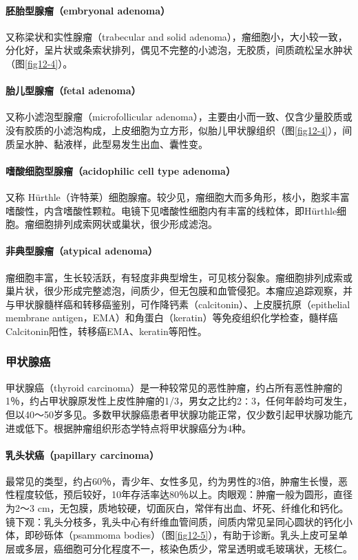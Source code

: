 \paragraph{胚胎型腺瘤（embryonal adenoma）}
又称梁状和实性腺瘤（trabecular
and solid
adenoma），瘤细胞小，大小较一致，分化好，呈片状或条索状排列，偶见不完整的小滤泡，无胶质，间质疏松呈水肿状（图\ref{fig12-4}）。

\paragraph{胎儿型腺瘤（fetal adenoma）}
又称小滤泡型腺瘤（microfollicular
adenoma），主要由小而一致、仅含少量胶质或没有胶质的小滤泡构成，上皮细胞为立方形，似胎儿甲状腺组织（图\ref{fig12-4}），间质呈水肿、黏液样，此型易发生出血、囊性变。

\paragraph{嗜酸细胞型腺瘤（acidophilic cell type adenoma）}
又称
Hürthle（许特莱）细胞腺瘤。较少见，瘤细胞大而多角形，核小，胞浆丰富嗜酸性，内含嗜酸性颗粒。电镜下见嗜酸性细胞内有丰富的线粒体，即Hürthle细胞。瘤细胞排列成索网状或巢状，很少形成滤泡。

\paragraph{非典型腺瘤（atypical adenoma）}
瘤细胞丰富，生长较活跃，有轻度非典型增生，可见核分裂象。瘤细胞排列成索或巢片状，很少形成完整滤泡，间质少，但无包膜和血管侵犯。本瘤应追踪观察，并与甲状腺髓样癌和转移癌鉴别，可作降钙素（calcitonin）、上皮膜抗原（epithelial
membrane
antigen，EMA）和角蛋白（keratin）等免疫组织化学检查，髓样癌Calcitonin阳性，转移癌EMA、keratin等阳性。

\subsubsection{甲状腺癌}

甲状腺癌（thyroid
carcinoma）是一种较常见的恶性肿瘤，约占所有恶性肿瘤的1％，约占甲状腺原发性上皮性肿瘤的1/3，男女之比约2∶3，任何年龄均可发生，但以40～50岁多见。多数甲状腺癌患者甲状腺功能正常，仅少数引起甲状腺功能亢进或低下。根据肿瘤组织形态学特点将甲状腺癌分为4种。

\paragraph{乳头状癌（papillary carcinoma）}
最常见的类型，约占60％，青少年、女性多见，约为男性的3倍，肿瘤生长慢，恶性程度较低，预后较好，10年存活率达80％以上。肉眼观：肿瘤一般为圆形，直径为2～3
cm，无包膜，质地较硬，切面灰白，常伴有出血、坏死、纤维化和钙化。镜下观：乳头分枝多，乳头中心有纤维血管间质，间质内常见呈同心圆状的钙化小体，即砂砾体（psammoma
bodies）（图\ref{fig12-5}），有助于诊断。乳头上皮可呈单层或多层，癌细胞可分化程度不一，核染色质少，常呈透明或毛玻璃状，无核仁。

